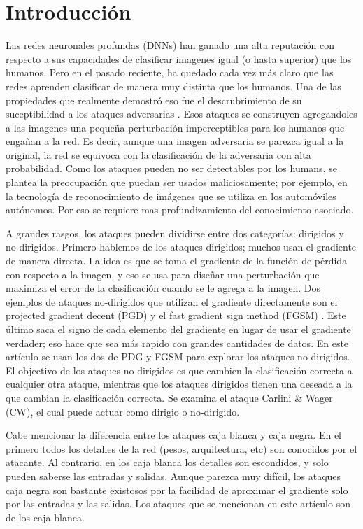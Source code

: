 \section{Introducción}

Las redes neuronales profundas (DNNs) han ganado una alta reputación con respecto a sus capacidades de clasificar imagenes igual (o hasta superior) que los humanos. Pero en el pasado reciente, ha quedado cada vez más claro que las redes aprenden clasificar de manera muy distinta que los humanos. Una de las propiedades que realmente demostró eso fue el descrubrimiento de su suceptibilidad a los ataques adversarias \cite{szegedy2014intriguing}. Esos ataques se construyen agregandoles a las imagenes una pequeña perturbación imperceptibles para los humanos que engañan a la red. Es decir, aunque una imagen adversaria se parezca igual a la original, la red se equivoca con la clasificación de la adversaria con alta probabilidad. Como los ataques pueden no ser detectables por los humans, se plantea la preocupación que puedan ser usados maliciosamente; por ejemplo, en la tecnología de reconocimiento de imágenes que se utiliza en los automóviles autónomos. Por eso se requiere mas profundizamiento del conocimiento asociado. 

A grandes rasgos, los ataques pueden dividirse entre dos categorías: dirigidos y no-dirigidos. Primero hablemos de los ataques dirigidos; muchos usan el gradiente de manera directa. La idea es que se toma el gradiente de la función de pérdida con respecto a la imagen, y eso se usa para diseñar una perturbación que maximiza el error de la clasificación cuando se le agrega a la imagen. Dos ejemplos de ataques no-dirigidos que utilizan el gradiente directamente son el projected gradient decent (PGD) \cite{madry2019deep} y el fast gradient sign method (FGSM) \cite{goodfellow2015explaining}. Este último saca el signo de cada elemento del gradiente en lugar de usar el gradiente verdader; eso hace que sea más rapido con grandes cantidades de datos. En este artículo se usan los dos de PDG y FGSM para explorar los ataques no-dirigidos. El objectivo de los ataques no dirigidos es que cambien la clasificación correcta a cualquier otra ataque, mientras que los ataques dirigidos tienen una deseada a la que cambian la clasificación correcta. Se examina el ataque Carlini \& Wager (CW), el cual puede actuar como dirigio o no-dirigido. 

Cabe mencionar la diferencia entre los ataques caja blanca y caja negra. En el primero todos los detalles de la red (pesos, arquitectura, etc) son conocidos por el atacante. Al contrario, en los caja blanca los detalles son escondidos, y solo pueden saberse las entradas y salidas. Aunque parezca muy difícil, los ataques caja negra son bastante existosos por la facilidad de aproximar el gradiente solo por las entradas y las salidas. Los ataques que se mencionan en este artículo son de los caja blanca.

